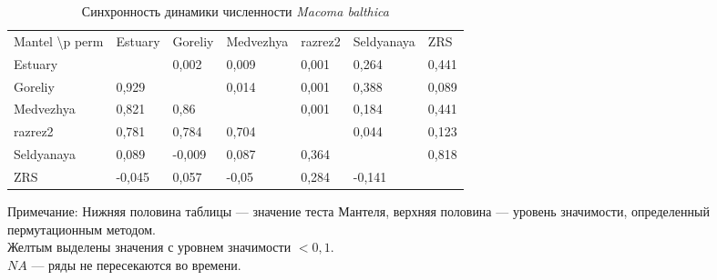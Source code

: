 \documentclass[a4paper,12pt]{article}
\begin{document}

	\begin{table}[ht]
	\caption{Синхронность динамики численности {\it Macoma balthica}}
	\label{tab:Mantel_dynamic_N}
        \begin{tabularx}{\textwidth}{|p{}|*{6}{X|}} \hline
Mantel \textbackslash p perm & Estuary & Goreliy & Medvezhya & razrez2 & Seldyanaya & ZRS   \\
Estuary                      &         & 0,002   & 0,009     & 0,001   & 0,264      & 0,441 \\
Goreliy                      & 0,929   &         & 0,014     & 0,001   & 0,388      & 0,089 \\
Medvezhya                    & 0,821   & 0,86    &           & 0,001   & 0,184      & 0,441 \\
razrez2                      & 0,781   & 0,784   & 0,704     &         & 0,044      & 0,123 \\
Seldyanaya                   & 0,089   & -0,009  & 0,087     & 0,364   &            & 0,818 \\
ZRS                          & -0,045  & 0,057   & -0,05     & 0,284   & -0,141     &       \\
	\end{tabularx}
	   {\footnotesize Примечание: Нижняя половина таблицы --- значение теста Мантеля, верхняя половина --- уровень значимости, определенный пермутационным методом. \\
Желтым выделены значения с уровнем значимости $< 0,1$. \\
$NA$ --- ряды не пересекаются во времени.}
	\end{table}
\end{document}
